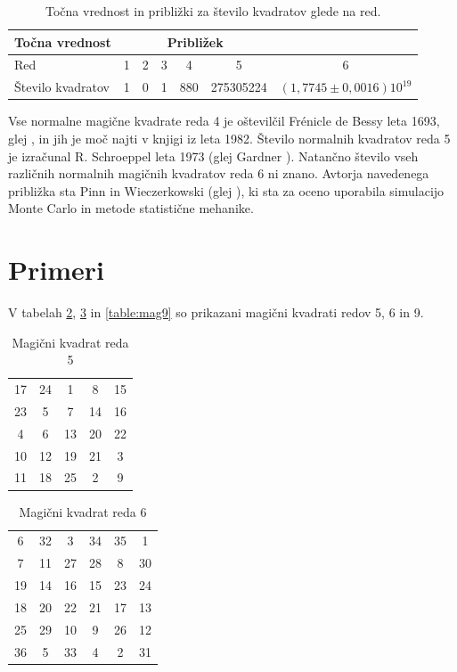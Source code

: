 \documentclass[a4paper,12pt]{article}
\theoremstyle{definition}
\theoremstyle{plain}
\newenvironment{magic}[3]{%
    \begin{table}[ht]
    \centering
    \caption{#2}
    \label{#3}
    \begin{tabular}{|*{#1}{c|}} %
    \hline
}{%
    \hline
    \end{tabular}
    \end{table}
}
\begin{document}
\begin{table}[!ht]
   \centering
   \caption{Točna vrednost in približki za število kvadratov glede na red.}
   \label{tab:st_kvadratov}
   \begin{tabular}{lcccccc}\toprule
       Točna vrednost & \multicolumn{5}{c}{Približek} & \\ \midrule
       Red & 1 & 2 & 3 & 4 & 5 & 6 \\ 
       Število kvadratov & 1 & 0 & 1 & 880 & 275305224 & $(1,7745 \pm 0,0016)10^19$ \\ \bottomrule
   \end{tabular}
\end{table}

Vse normalne magične kvadrate reda 4 je oštevilčil Frénicle de Bessy
leta 1693, glej \cite{bessy}, in jih je moč najti v knjigi \cite{berlekamp}
iz leta 1982. Število normalnih kvadratov reda 5 je izračunal
R. Schroeppel leta 1973 (glej Gardner \cite{gardner}).
Natančno število vseh različnih normalnih magičnih kvadratov reda 6 ni znano.
Avtorja navedenega približka sta Pinn in Wieczerkowski (glej \cite{pinn}), ki
sta za oceno uporabila simulacijo Monte Carlo in metode statistične mehanike.


\section{Primeri}

V tabelah \ref{table:mag5}, \ref{table:mag6} in \ref{table:mag9} so prikazani
magični kvadrati redov 5, 6 in 9.

\begin{magic}{5}{Magični kvadrat reda 5}{table:mag5}
17 & 24 &  1 &  8 & 15 \\
23 &  5 &  7 & 14 & 16 \\
4 &  6 & 13 & 20 & 22 \\
10 & 12 & 19 & 21 &  3 \\
11 & 18 & 25 &  2 &  9 \\
\end{magic}


\begin{magic}{6}{Magični kvadrat reda 6}{table:mag6}
6 & 32 &  3 & 34 & 35 &  1 \\
7 & 11 & 27 & 28 &  8 & 30 \\
19 & 14 & 16 & 15 & 23 & 24 \\
18 & 20 & 22 & 21 & 17 & 13 \\
25 & 29 & 10 &  9 & 26 & 12 \\
36 &  5 & 33 &  4 &  2 & 31 \\
\end{magic}
\end{document}
